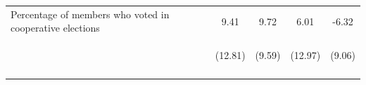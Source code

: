 \documentclass[11pt]{article}
\begin{document}
\begin{table}[H]
{\begin{tabularx}{1.3\linewidth}{lcccc}
\noalign{\smallskip}Percentage of members who voted in cooperative elections & 9.41 & 9.72 & 6.01 & -6.32\\
 & \begin{footnotesize}(12.81)\end{footnotesize} & \begin{footnotesize}(9.59)\end{footnotesize} & \begin{footnotesize}(12.97)\end{footnotesize} & \begin{footnotesize}(9.06)\end{footnotesize}\\
\noalign{\smallskip}\hline
  \end{tabularx}}
\end{table}
\doublespacing
\end{document}
